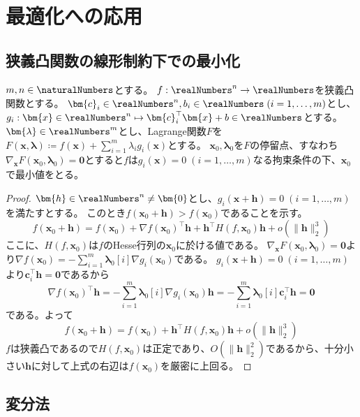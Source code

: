 \chapter{最適化への応用}
    \section{狭義凸関数の線形制約下での最小化}
        \begin{shadebox}
            $m,n\in\naturalNumbers$とする。
            $f: \realNumbers^n \to \realNumbers$を狭義凸関数とする。
            $\bm{c}_i \in \realNumbers^n, b_i \in \realNumbers\;(i=1,\dotsc,m)$とし、$g_i: \bm{x} \in \realNumbers^n \mapsto \bm{c}_i^\top\bm{x} + b \in \realNumbers$とする。
            $\bm{\lambda} \in \realNumbers^m$とし、Lagrange関数$F$を$F(\bm{x},\bm{\lambda}) \coloneq f(\bm{x}) + \sum_{i=1}^m \lambda_i g_i(\bm{x})$とする。
            $\bm{x}_0, \bm{\lambda}_0$を$F$の停留点、すなわち$\nabla_\bm{x}F(\bm{x}_0, \bm{\lambda}_0) = \bm{0}$とすると$f$は$g_i(\bm{x}) = 0\;(i=1,\dotsc,m)$なる拘束条件の下、$\bm{x}_0$で最小値をとる。
        \end{shadebox}
        \begin{proof}
            \quad\par
            $\bm{h} \in \realNumbers^n \neq \bm{0}$とし、$g_i(\bm{x} + \bm{h}) = 0\;(i=1,\dotsc,m)$を満たすとする。
            このとき$f(\bm{x}_0 + \bm{h}) > f(\bm{x}_0)$であることを示す。
            \[ f(\bm{x}_0 + \bm{h}) = f(\bm{x}_0) + \nabla f(\bm{x}_0)^\top\bm{h} + \bm{h}^\top H(f,\bm{x}_0)\bm{h} + o(\|\bm{h}\|_2^3) \]
            ここに、$H(f,\bm{x}_0)$は$f$のHesse行列の$\bm{x}_0$に於ける値である。
            $\nabla_\bm{x}F(\bm{x}_0, \bm{\lambda}_0) = \bm{0}$より$\nabla f(\bm{x}_0) = -\sum_{i=1}^m \bm{\lambda}_0[i] \nabla g_i(\bm{x}_0)$である。
            $g_i(\bm{x} + \bm{h}) = 0\;(i=1,\dotsc,m)$より$\bm{c}_i^\top\bm{h} = \bm{0}$であるから
            \[ \nabla f(\bm{x}_0)^\top\bm{h} = -\sum_{i=1}^m \bm{\lambda}_0[i] \nabla g_i(\bm{x}_0)\bm{h} = -\sum_{i=1}^m \bm{\lambda}_0[i] \bm{c}_i^\top\bm{h} = \bm{0} \]
            である。よって
            \[ f(\bm{x}_0 + \bm{h}) = f(\bm{x}_0) + \bm{h}^\top H(f,\bm{x}_0)\bm{h} + o(\|\bm{h}\|_2^3) \]
            $f$は狭義凸であるので$H(f,\bm{x}_0)$は正定であり、$O(\|\bm{h}\|_2^2)$であるから、十分小さい$\bm{h}$に対して上式の右辺は$f(\bm{x}_0)$を厳密に上回る。
        \end{proof}
    \section{変分法}
